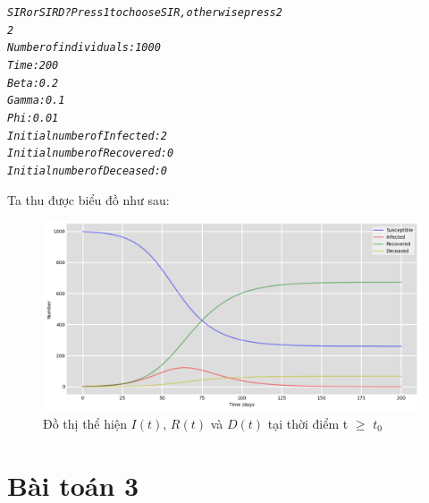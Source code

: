 \documentclass[a4paper]{article}
\begin{document}
\begin{mdframed}[hidealllines=true,backgroundcolor=blue!10]
\begin{alltt}
\textit{
SIR or SIRD? Press 1 to choose SIR, otherwise press 2
2
Number of individuals: 1000
Time: 200
Beta: 0.2
Gamma: 0.1
Phi: 0.01
Initial number of Infected: 2
Initial number of Recovered: 0
Initial number of Deceased: 0
}
\end{alltt}
\end{mdframed}

Ta thu được biểu đồ như sau:

\begin{figure}[!ht]\caption{ Đồ thị thể hiện  ${I(t)}$, ${R(t)}$ và ${D(t)}$ tại thời điểm t  $\geq$  $t_{0}$ }  \label{Fig:Frequency1}
	\begin{center}
	\includegraphics[scale=0.5]{Images/Frequency2.png}
	\end{center}
\end{figure}

\break 
\newpage
\section{Bài toán 3}
\end{document}
